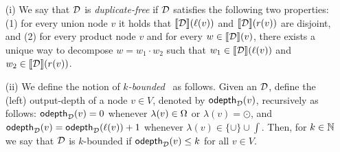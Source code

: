 \begin{enumerate}
	\item[(i)] We say that $\mathcal{D}$ is \emph{duplicate-free} if $\mathcal{D}$ satisfies the following two properties: (1) for every union node $v$ it holds that ${\llbracket{\mathcal{D}}\rrbracket}(\ell(v))$ and ${\llbracket{\mathcal{D}}\rrbracket}(r(v))$ are disjoint, and (2) for every product node $v$ and for every $w \in {\llbracket{\mathcal{D}}\rrbracket}(v)$, there exists a unique way to decompose $w = w_1 \cdot w_2$ such that $w_1 \in {\llbracket{\mathcal{D}}\rrbracket}(\ell(v))$ and $w_2 \in {\llbracket{\mathcal{D}}\rrbracket}(r(v))$. 
	
	\item[(ii)] We define the notion of \emph{$k$-bounded}~\dsabbr{} as follows. 
	Given an \dsabbr{} $\mathcal{D}$, define the (left) output-depth of a node $v\in V$, denoted by $\mathsf{odepth}_{\mathcal{D}}(v)$, recursively as follows:
	$\mathsf{odepth}_{\mathcal{D}}(v) = 0$ whenever $\lambda(v)\in\Omega$ or $\lambda(v) = \odot$, and $\mathsf{odepth}_{\mathcal{D}}(v) = \mathsf{odepth}_{\mathcal{D}}(\ell(v))+1$ whenever $\lambda(v) \in \{\cup\}\cup\int$.
	Then, for $k\in\mathbb{N}$ we say that 
	$\mathcal{D}$ is $k$-bounded if $\mathsf{odepth}_{\mathcal{D}}(v)\leq k$ for all $v\in V$.
\end{enumerate}


%

